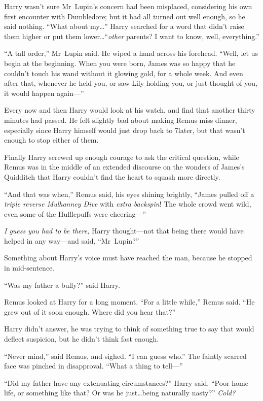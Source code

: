Harry wasn’t sure Mr~Lupin’s concern had been misplaced, considering his own first encounter with Dumbledore; but it had all turned out well enough, so he said nothing.
“What about my…” Harry searched for a word that didn’t raise them higher or put them lower…“\emph{other} parents? I want to know, well, everything.”

“A tall order,” Mr~Lupin said. He wiped a hand across his forehead.
“Well, let us begin at the beginning. When you were born, James was so happy that he couldn’t touch his wand without it glowing gold, for a whole week. And even after that, whenever he held you, or saw Lily holding you, or just thought of you, it would happen again—”

\later

Every now and then Harry would look at his watch, and find that another thirty minutes had passed. He felt slightly bad about making Remus miss dinner, especially since Harry himself would just drop back to 7\pm later, but that wasn’t enough to stop either of them.

Finally Harry screwed up enough courage to ask the critical question, while Remus was in the middle of an extended discourse on the wonders of James’s Quidditch that Harry couldn’t find the heart to squash more directly.

“And that was when,” Remus said, his eyes shining brightly,
“James pulled off a \emph{triple reverse Mulhanney Dive} with \emph{extra backspin}! The whole crowd went wild, even some of the Hufflepuffs were cheering—”

\emph{I guess you had to be there,} Harry thought—not that being there would have helped in any way—and said,
“Mr~Lupin?”

Something about Harry’s voice must have reached the man, because he stopped in mid-sentence.

“Was my father a bully?” said Harry.

Remus looked at Harry for a long moment.
“For a little while,” Remus said.
“He grew out of it soon enough. Where did you hear that?”

Harry didn’t answer, he was trying to think of something true to say that would deflect suspicion, but he didn’t think fast enough.

“Never mind,” said Remus, and sighed.
“I can guess who.” The faintly scarred face was pinched in disapproval.
“What a thing to tell—”

“Did my father have any extenuating circumstances?” Harry said.
“Poor home life, or something like that? Or was he just…being naturally nasty?” \emph{Cold?}

